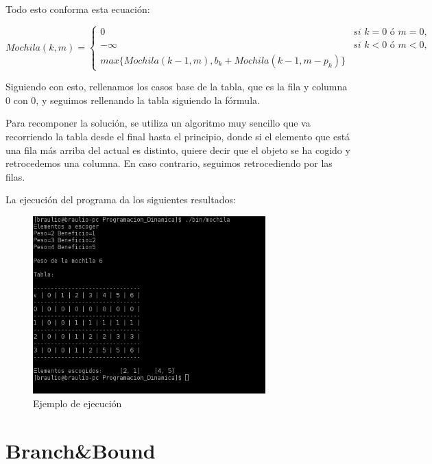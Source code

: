 \documentclass[10pt,a4paper,spanish]{report}
\theoremstyle{definition}
\theoremstyle{remark}
\begin{document}
Todo esto conforma esta ecuación:

\begin{equation*}
Mochila(k,m)= 
\begin{cases}
0 & \textit{si } k = 0 \textit{ ó } m=0, \\
-\infty & \textit{si } k < 0 \textit{ ó } m < 0, \\
max\{Mochila(k-1,m), b_k + Mochila(k-1, m-p_k)\} &
\end{cases}
\end{equation*}

Siguiendo con esto, rellenamos los casos base de la tabla, que es la fila y columna 0 con 0, y seguimos rellenando la tabla siguiendo la fórmula.

Para recomponer la solución, se utiliza un algoritmo muy sencillo que va recorriendo la tabla desde el final hasta el principio, donde si el elemento que está una fila más arriba del actual es distinto, quiere decir que el objeto se ha cogido y retrocedemos una columna. En caso contrario, seguimos retrocediendo por las filas.


La ejecución del programa da los siguientes resultados:

\begin{center}
\begin{figure}[!h]
\centering
\includegraphics[width=0.8\textwidth]{figura4}
\caption{Ejemplo de ejecución}
\label{figura4}
\end{figure}
\end{center}

\section{\textcolor[rgb]{0.1,0.2,1}Branch\&Bound}
\label{bb}
\end{document}
